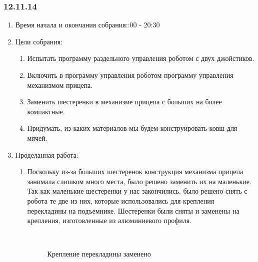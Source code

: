 
\subsubsection{12.11.14} 

\begin{enumerate} 
	\item Время начала и окончания собрания::00 - 20:30
	\item Цели собрания:
	\begin{enumerate}
		\item Испытать программу раздельного управления роботом с двух джойстиков.
		
		\item Включить в программу управления роботом программу управления механизмом прицепа.
		
		\item Заменить шестеренки в механизме прицепа с больших на более компактные.
		
		\item Придумать, из каких материалов мы будем конструировать ковш для мячей.
		
	\end{enumerate}
	
	\item Проделанная работа:
	\begin{enumerate}
		\item Поскольку из-за больших шестеренок конструкция механизма прицепа занимала слишком много места, было решено заменить их на маленькие. Так как маленькие шестеренки у нас закончились, было решено снять с робота те две из них, которые использовались для крепления перекладины на подъемнике. Шестеренки были сняты и заменены на крепления, изготовленные из алюминиевого профиля.
		
		\begin{figure}[H]
			\begin{minipage}[h]{0.2\linewidth}
				\center  
			\end{minipage}
			\begin{minipage}[h]{0.6\linewidth}
				\caption{Крепление перекладины заменено}
			\end{minipage}
		\end{figure}
		

\end{enumerate}
\end{enumerate}

